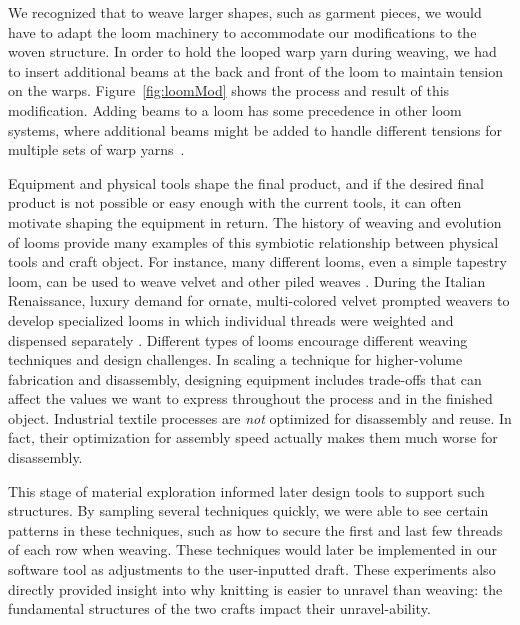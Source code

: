 We recognized that to weave larger shapes, such as garment pieces, we would have to adapt the loom machinery to accommodate our modifications to the woven structure. In order to hold the looped warp yarn during weaving, we had to insert additional beams at the back and front of the loom to maintain tension on the warps. Figure~\ref{fig:loomMod} shows the process and result of this modification. Adding beams to a loom has some precedence in other loom systems, where additional beams might be added to handle different tensions for multiple sets of warp yarns~\cite{essen_easysupp_2016}.

Equipment and physical tools shape the final product, and if the desired final product is not possible or easy enough with the current tools, it can often motivate shaping the equipment in return. The history of weaving and evolution of looms provide many examples of this symbiotic relationship between physical tools and craft object. For instance, many different looms, even a simple tapestry loom, can be used to weave velvet and other piled weaves \cite{essen_easysupp_2016}. During the Italian Renaissance, luxury demand for ornate, multi-colored velvet prompted weavers to develop specialized looms in which individual threads were weighted and dispensed separately \cite{watt_renaissance_velvet}.
Different types of looms encourage different weaving techniques and design challenges. In scaling a technique for higher-volume fabrication and disassembly, designing equipment includes trade-offs that can affect the values we want to express throughout the process and in the finished object. Industrial textile processes are \emph{not} optimized for disassembly and reuse. In fact, their optimization for assembly speed actually makes them much worse for disassembly.

This stage of material exploration informed later design tools to support such structures. By sampling several techniques quickly, we were able to see certain patterns in these techniques, such as how to secure the first and last few threads of each row when weaving. These techniques would later be implemented in our software tool as adjustments to the user-inputted draft. These experiments also directly provided insight into why knitting is easier to unravel than weaving: the fundamental structures of the two crafts impact their unravel-ability. 

